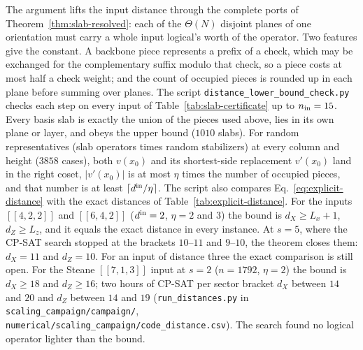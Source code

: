 \documentclass[aps,prx,reprint,superscriptaddress,nofootinbib,floatfix,longbibliography]{revtex4-2}
\theoremstyle{definition}
\begin{document}
The argument lifts the input distance through the complete ports of
Theorem~\ref{thm:slab-resolved}: each of the $\Theta(N)$ disjoint planes of one
orientation must carry a whole input logical's worth of the operator.  Two
features give the constant.  A backbone piece represents a prefix of a check,
which may be exchanged for the complementary suffix modulo that check, so a
piece costs at most half a check weight; and the count of occupied pieces is
rounded up in each plane before summing over planes.  The script \texttt{distance\_lower\_bound\_check.py} checks each step on every
input of Table~\ref{tab:slab-certificate} up to $n_{\rm in}=15$.  Every basis
slab is exactly the union of the pieces used above, lies in its own plane or
layer, and obeys the upper bound ($1010$ slabs).  For random representatives
(slab operators times random stabilizers) at every column and height ($3858$
cases), both $v(x_0)$ and its shortest-side replacement $v'(x_0)$ land in the
right coset, $|v'(x_0)|$ is at most $\eta$ times the number of occupied pieces,
and that number is at least $\lceil d^{\rm in}/\eta\rceil$.  The script also
compares Eq.~\eqref{eq:explicit-distance} with the exact distances of
Table~\ref{tab:explicit-distance}.  For the inputs $[[4,2,2]]$ and $[[6,4,2]]$
($d^{\rm in}=2$, $\eta=2$ and $3$) the bound is $d_X\ge L_x+1$,
$d_Z\ge L_z$, and it equals the exact distance in every instance.  At $s=5$,
where the CP-SAT search stopped at the brackets $10$--$11$ and $9$--$10$, the
theorem closes them: $d_X=11$ and $d_Z=10$.  For an input of distance three
the exact comparison is still open.  For the Steane $[[7,1,3]]$ input at $s=2$
($n=1792$, $\eta=2$) the bound is $d_X\ge18$ and $d_Z\ge16$; two hours of
CP-SAT per sector bracket $d_X$ between $14$ and $20$ and $d_Z$ between $14$
and $19$ (\texttt{run\_distances.py} in \nolinkurl{scaling_campaign/campaign/},
\nolinkurl{numerical/scaling_campaign/code_distance.csv}).  The search found
no logical operator lighter than the bound.
\end{document}

